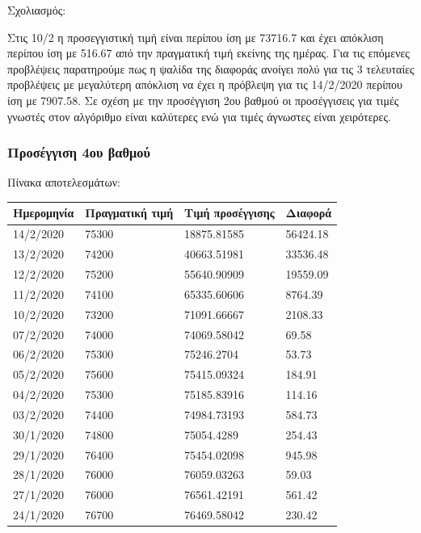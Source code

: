 \documentclass[a4paper,11pt]{article}
\begin{document}
	Σχολιασμός:
	\hfill \break
	
	Στις 10/2 η προσεγγιστική τιμή είναι περίπου ίση με 73716.7 και έχει απόκλιση περίπου ίση με 516.67 από την πραγματική τιμή εκείνης της ημέρας. Για τις επόμενες προβλέψεις
	παρατηρούμε πως η ψαλίδα της διαφοράς ανοίγει πολύ για τις 3 τελευταίες προβλέψεις με μεγαλύτερη απόκλιση να έχει η πρόβλεψη για τις 14/2/2020 περίπου ίση με 7907.58. Σε σχέση με την προσέγγιση 2ου βαθμού οι προσέγγισεις για τιμές γνωστές στον αλγόριθμο είναι καλύτερες ενώ για τιμές άγνωστες είναι χειρότερες.

	\subsubsection{Προσέγγιση 4ου βαθμού}
	
	Πίνακα αποτελεσμάτων:
	
	\begin{tabular}{| l | l | l | l |}
		\hline
	Ημερομηνία & Πραγματική τιμή & Τιμή προσέγγισης & Διαφορά
	\\ \hline
	14/2/2020 & 75300 & 18875.81585 & 56424.18
	\\ \hline
	13/2/2020 & 74200 & 40663.51981 & 33536.48
	\\ \hline
	12/2/2020 & 75200 & 55640.90909 & 19559.09
	\\ \hline
	11/2/2020 & 74100 & 65335.60606 & 8764.39
	\\ \hline
	10/2/2020 & 73200 & 71091.66667 & 2108.33
	\\ \hline
	07/2/2020 & 74000 & 74069.58042 & 69.58
	\\ \hline
	06/2/2020 & 75300 & 75246.2704 & 53.73
	\\ \hline
	05/2/2020 & 75600 & 75415.09324 & 184.91
	\\ \hline
	04/2/2020 & 75300 & 75185.83916 & 114.16
	\\ \hline
	03/2/2020 & 74400 & 74984.73193 & 584.73
	\\ \hline
	30/1/2020 & 74800 & 75054.4289 & 254.43
	\\ \hline
	29/1/2020 & 76400 & 75454.02098 & 945.98
	\\ \hline
	28/1/2020 & 76000 & 76059.03263 & 59.03
	\\ \hline
	27/1/2020 & 76000 & 76561.42191 & 561.42
	\\ \hline
	24/1/2020 & 76700 & 76469.58042 & 230.42
	\\ \hline
	\end{tabular}

	\hfill \break
	
\end{document}
